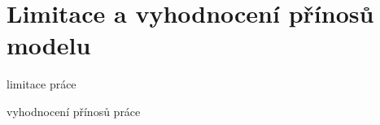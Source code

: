 \chapter{Limitace a vyhodnocení přínosů modelu}
\label{chap:testovani}

limitace práce

vyhodnocení přínosů práce